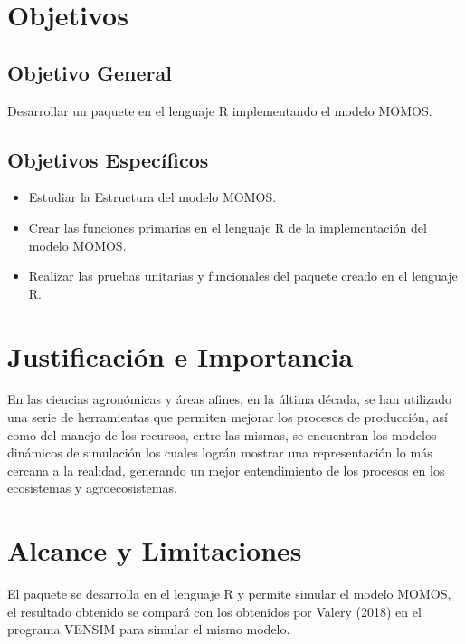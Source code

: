 \section{Objetivos}

\subsection{Objetivo General}
Desarrollar un paquete en el lenguaje R implementando el modelo MOMOS.


\subsection{Objetivos Espec\'ificos}

\begin{itemize}
\item Estudiar la Estructura del modelo MOMOS.
\item Crear las funciones primarias en el lenguaje R de la implementación del modelo MOMOS.
\item Realizar las pruebas unitarias y funcionales del paquete creado en el lenguaje R.
\end{itemize}

\section{Justificaci\'on e Importancia}

En las ciencias agronómicas y áreas afines, en la última década, se han utilizado una serie de herramientas que permiten mejorar los procesos de producción, así como del manejo de los recursos, entre las mismas, se encuentran los modelos dinámicos de simulación los cuales lográn mostrar una representación lo más cercana a la realidad, generando un mejor entendimiento de los procesos en los ecosistemas y agroecosistemas. \\

\section{Alcance y Limitaciones}

El paquete se desarrolla en el lenguaje R y permite simular el modelo MOMOS, el resultado obtenido se compará con los obtenidos por Valery (2018) en el programa VENSIM para simular el mismo modelo. \\
